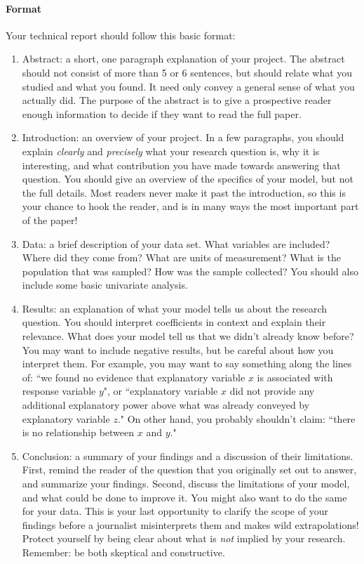\documentclass[10pt]{article}
\begin{document}
\paragraph{Format}
Your technical report should follow this basic format:
	\begin{enumerate}
		\item Abstract: a short, one paragraph explanation of your project. The abstract should not consist of more than 5 or 6 sentences, but should relate what you studied and what you found. It need only convey a general sense of what you actually did. The purpose of the abstract is to give a prospective reader enough information to decide if they want to read the full paper. 
		\item Introduction: an overview of your project. In a few paragraphs, you should explain \emph{clearly} and \emph{precisely} what your research question is, why it is interesting, and what contribution you have made towards answering that question. You should give an overview of the specifics of your model, but not the full details. Most readers never make it past the introduction, so this is your chance to hook the reader, and is in many ways the most important part of the paper!
		\item Data: a brief description of your data set. What variables are included? Where did they come from? What are units of measurement? What is the population that was sampled? How was the sample collected? You should also include some basic univariate analysis. 
		\item Results: an explanation of what your model tells us about the research question. You should interpret coefficients in context and explain their relevance. What does your model tell us that we didn't already know before? You may want to include negative results, but be careful about how you interpret them. For example, you may want to say something along the lines of: ``we found no evidence that explanatory variable $x$ is associated with response variable $y$", or ``explanatory variable $x$ did not provide any additional explanatory power above what was already conveyed by explanatory variable $z$." On other hand, you probably shouldn't claim: ``there is no relationship between $x$ and $y$."
		\item Conclusion: a summary of your findings and a discussion of their limitations. First, remind the reader of the question that you originally set out to answer, and summarize your findings. Second, discuss the limitations of your model, and what could be done to improve it. You might also want to do the same for your data. This is your last opportunity to clarify the scope of your findings before a journalist misinterprets them and makes wild extrapolations! Protect yourself by being clear about what is \emph{not} implied by your research. Remember: be both skeptical and constructive.
	\end{enumerate}
\end{document}
